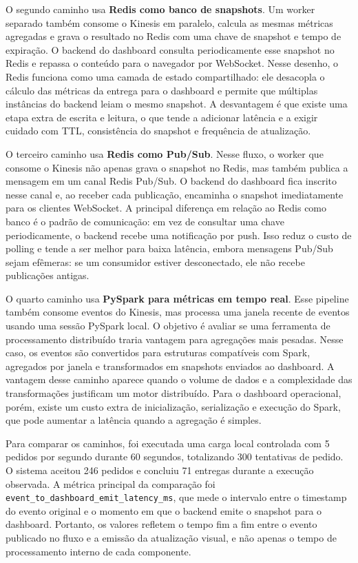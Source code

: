 ﻿\documentclass{article}
\begin{document}
O segundo caminho usa \textbf{Redis como banco de snapshots}. Um worker separado tamb\'em consome o Kinesis em paralelo, calcula as mesmas m\'etricas agregadas e grava o resultado no Redis com uma chave de snapshot e tempo de expira\c{c}\~ao. O backend do dashboard consulta periodicamente esse snapshot no Redis e repassa o conte\'udo para o navegador por WebSocket. Nesse desenho, o Redis funciona como uma camada de estado compartilhado: ele desacopla o c\'alculo das m\'etricas da entrega para o dashboard e permite que m\'ultiplas inst\^ancias do backend leiam o mesmo snapshot. A desvantagem \'e que existe uma etapa extra de escrita e leitura, o que tende a adicionar lat\^encia e a exigir cuidado com TTL, consist\^encia do snapshot e frequ\^encia de atualiza\c{c}\~ao.

O terceiro caminho usa \textbf{Redis como Pub/Sub}. Nesse fluxo, o worker que consome o Kinesis n\~ao apenas grava o snapshot no Redis, mas tamb\'em publica a mensagem em um canal Redis Pub/Sub. O backend do dashboard fica inscrito nesse canal e, ao receber cada publica\c{c}\~ao, encaminha o snapshot imediatamente para os clientes WebSocket. A principal diferen\c{c}a em rela\c{c}\~ao ao Redis como banco \'e o padr\~ao de comunica\c{c}\~ao: em vez de consultar uma chave periodicamente, o backend recebe uma notifica\c{c}\~ao por push. Isso reduz o custo de polling e tende a ser melhor para baixa lat\^encia, embora mensagens Pub/Sub sejam ef\^emeras: se um consumidor estiver desconectado, ele n\~ao recebe publica\c{c}\~oes antigas.

O quarto caminho usa \textbf{PySpark para m\'etricas em tempo real}. Esse pipeline tamb\'em consome eventos do Kinesis, mas processa uma janela recente de eventos usando uma sess\~ao PySpark local. O objetivo \'e avaliar se uma ferramenta de processamento distribu\'ido traria vantagem para agrega\c{c}\~oes mais pesadas. Nesse caso, os eventos s\~ao convertidos para estruturas compat\'iveis com Spark, agregados por janela e transformados em snapshots enviados ao dashboard. A vantagem desse caminho aparece quando o volume de dados e a complexidade das transforma\c{c}\~oes justificam um motor distribu\'ido. Para o dashboard operacional, por\'em, existe um custo extra de inicializa\c{c}\~ao, serializa\c{c}\~ao e execu\c{c}\~ao do Spark, que pode aumentar a lat\^encia quando a agrega\c{c}\~ao \'e simples.

Para comparar os caminhos, foi executada uma carga local controlada com 5 pedidos por segundo durante 60 segundos, totalizando 300 tentativas de pedido. O sistema aceitou 246 pedidos e concluiu 71 entregas durante a execu\c{c}\~ao observada. A m\'etrica principal da compara\c{c}\~ao foi \texttt{event\_\allowbreak to\_\allowbreak dashboard\_\allowbreak emit\_\allowbreak latency\_\allowbreak ms}, que mede o intervalo entre o timestamp do evento original e o momento em que o backend emite o snapshot para o dashboard. Portanto, os valores refletem o tempo fim a fim entre o evento publicado no fluxo e a emiss\~ao da atualiza\c{c}\~ao visual, e n\~ao apenas o tempo de processamento interno de cada componente.
\end{document}
